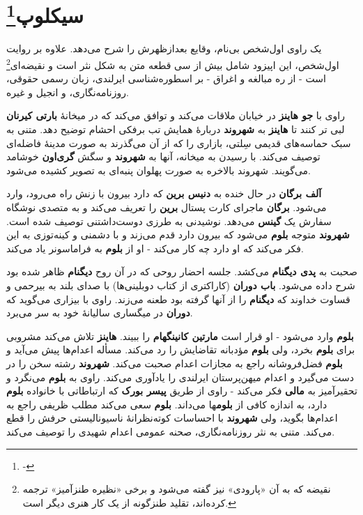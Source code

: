 \documentclass[12pt]{book}
\newcommand{\noun}[1]{{\textbf{#1}}}
\begin{document}
    \chapter[سیکلوپ]{سیکلوپ\protect\footnote{-}}\label{ep:12}
    یک راوی اول‌شخص بی‌نام، وقایع بعدازظهرش را شرح می‌دهد. علاوه بر روایت اول‌شخص، این اپیزود شامل بیش از سی قطعه متن به شکل نثر است و نقیضه‌ای\footnote{نقیضه که به آن «پارودی» نیز گفته می‌شود و برخی «نظیره طنزآمیز» ترجمه کرده‌اند، تقلید طنزگونه از یک کار هنری دیگر است.} است - از ره مبالغه و اغراق - بر اسطوره‌شناسی ایرلندی، زبان رسمی حقوقی، روزنامه‌نگاری، و انجیل و غیره.

    راوی با \noun{جو هاینز} در خیابان ملاقات می‌کند و توافق می‌کند که در میخانهٔ \noun{بارتی کیرنان} لبی تر کنند تا \noun{هاینز} به \noun{شهروند‬} دربارهٔ همایش تب برفکی احشام توضیح دهد. متنی به سبک حماسه‌های قدیمی سِلتی، بازاری را که از آن می‌گذرند به صورت مدینهٔ فاضله‌ای توصیف می‌کند. با رسیدن به میخانه، آنها به \noun{شهروند‬} و سگش \noun{گری‌اون} خوشامد می‌گویند. شهروند بالاخره به صورت پهلوان پنبه‌ای به تصویر کشیده می‌شود.

    \noun{آلف برگان} در حال خنده به \noun{دنیس برین} که دارد بیرون با زنش راه می‌رود، وارد می‌شود. \noun{برگان} ماجرای کارت پستال  \noun{برین} را تعریف می‌کند و به متصدی نوشگاه سفارش یک \noun{گینس} می‌دهد. نوشیدنی به طرزی دوست‌داشتنی توصیف شده است. \noun{شهروند‬} متوجه \noun{بلوم} می‌شود که بیرون دارد قدم می‌زند و با دشمنی و کینه‌توزی به این فکر می‌کند که او دارد چه کار می‌کند - او از \noun{بلوم} به فراماسونر یاد می‌کند.

    صحبت به \noun{پدی دیگنام} می‌کشد. جلسه احضار روحی که در آن روح \noun{دیگنام} ظاهر شده بود شرح داده می‌شود. \noun{باب دوران} (کاراکتری از کتاب دوبلینی‌ها) با صدای بلند به بیرحمی و قساوت خداوند که \noun{دیگنام} را از آنها گرفته بود طعنه می‌زند. راوی با بیزاری می‌گوید که \noun{دوران} در میگساری سالیانهٔ خود به سر می‌برد.

    \noun{بلوم} وارد می‌شود - او قرار است \noun{مارتین کانینگهام} را ببیند. \noun{هاینز} تلاش می‌کند مشروبی برای \noun{بلوم} بخرد، ولی \noun{بلوم} مؤدبانه تقاضایش را رد می‌کند. مسأله اعدام‌ها پیش می‌آید و \noun{بلوم} فضل‌فروشانه راجع به مجازات اعدام صحبت می‌کند. \noun{شهروند‬} رشته سخن را در دست می‌گیرد و اعدام میهن‌پرستان ایرلندی را یادآوری می‌کند. راوی به \noun{بلوم} می‌نگرد و تحقیرآمیز به \noun{مالی} فکر می‌کند - راوی از طریق \noun{پیسر بورک} که ارتباطاتی با خانواده \noun{بلوم} دارد، به اندازه کافی از \noun{بلوم}ها می‌داند. \noun{بلوم} سعی می‌کند مطلب ظریفی راجع به اعدام‌ها بگوید، ولی \noun{شهروند‬} با احساسات کوته‌نظرانهٔ ناسیونالیستی حرفش را قطع می‌کند. متنی به نثر روزنامه‌نگاری، صحنه عمومی اعدام شهیدی را توصیف می‌کند.
\end{document}

